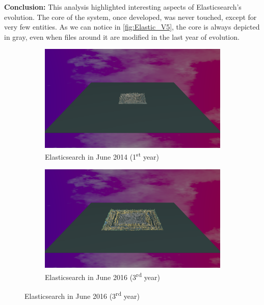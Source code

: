 \bigbreak
\noindent
\textbf{Conclusion:} This analysis highlighted interesting aspects of Elasticsearch's evolution. The core of the system, once developed, was never touched, except for very few entities. As we can notice in  \autoref{fig:Elastic_V5}, the core is always depicted in gray, even when files around it are modified in the last year of evolution. 

\begin{figure}[ht]
    \begin{subfigure}{0.48\textwidth}
        \includegraphics[width=\linewidth]{Elasticsearch/Animation001.png}
        \caption{Elasticsearch in June 2014 (1\textsuperscript{st} year)} 
        \label{fig:Elastic_V5_S1}
    \end{subfigure}\hspace*{\fill}
    \begin{subfigure}{0.48\textwidth}
        \includegraphics[width=\linewidth]{Elasticsearch/Animation003.png}
        \caption{Elasticsearch in June 2016 (3\textsuperscript{rd} year)} 
        \label{fig:Elastic_V5_S2}
    \end{subfigure}
    \medskip

\end{figure}
